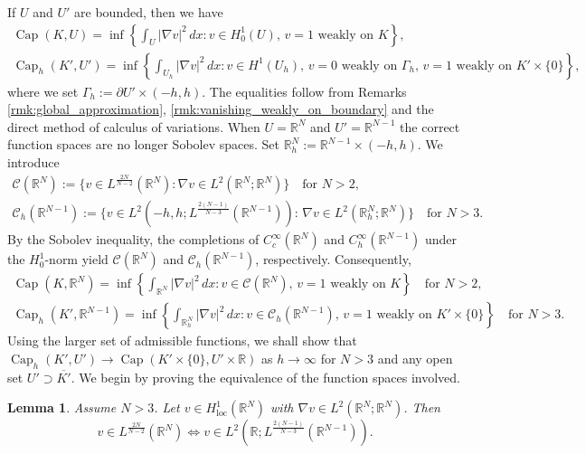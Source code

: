 \documentclass{article}
\numberwithin{equation}{section}
\newtheorem{lemma}[theorem]{Lemma}
\theoremstyle{definition}
\theoremstyle{remark}
\newcommand{\cpct}{\operatorname{Cap}}
\begin{document}
If $U$ and $U'$ are bounded, then we have
\begin{gather*}
    \cpct(K, U) = \inf \left\{\int_U |\nabla v|^2 \, dx : v \in H_0^1(U), \, v = 1 \text{ weakly on } K\right\}, \\
    \cpct_h(K', U') = \inf \left\{\int_{U_h} |\nabla v|^2 \, dx : v \in H^1(U_h), \, v = 0 \text{ weakly on } \Gamma_h, \, v = 1 \text{ weakly on } K' \times \{0\}\right\},
\end{gather*}
where we set $\Gamma_h := \partial U' \times (-h ,h)$. The equalities follow from Remarks \eqref{rmk:global_approximation}, \eqref{rmk:vanishing_weakly_on_boundary} and the direct method of calculus of variations. When $U = \mathbb{R}^N$ and $U' = \mathbb{R}^{N - 1}$ the correct function spaces are no longer Sobolev spaces. Set $\mathbb{R}_h^N := \mathbb{R}^{N - 1} \times (-h, h)$. We introduce
\begin{gather*}
    \mathcal{C}(\mathbb{R}^N) := \{v \in L^\frac{2N}{N - 2}(\mathbb{R}^N) : \nabla v \in L^2(\mathbb{R}^N; \mathbb{R}^N)\} \quad \text{for } N > 2, \\
    \mathcal{C}_h(\mathbb{R}^{N - 1}) := \{v \in L^2(-h , h; L^\frac{2(N - 1)}{N - 3}(\mathbb{R}^{N - 1})) : \, \nabla v \in L^2(\mathbb{R}_h^N; \mathbb{R}^N)\} \quad \text{for } N > 3.
\end{gather*}
By the Sobolev inequality, the completions of $C_c^\infty(\mathbb{R}^N)$ and $C_h^\infty(\mathbb{R}^{N - 1})$ under the $H_0^1$-norm yield $\mathcal{C}(\mathbb{R}^N)$ and $\mathcal{C}_h(\mathbb{R}^{N - 1})$, respectively. Consequently,
\begin{gather} \label{eq:extended_capacity_1}
    \cpct (K, \mathbb{R}^N) = \inf \left\{\int_{\mathbb{R}^N} |\nabla v|^2 \, dx : v \in \mathcal{C}(\mathbb{R}^N), \, v = 1 \text{ weakly on $K$}\right\} \quad \text{for } N > 2, \\ \label{eq:extended_capacity_2}
    \cpct_h(K', \mathbb{R}^{N - 1}) = \inf \left\{\int_{\mathbb{R}_h^N} |\nabla v|^2 \, dx : v \in \mathcal{C}_h(\mathbb{R}^{N - 1}), \, v = 1 \text{ weakly on $K' \times \{0\}$}\right\} \quad \text{for } N > 3.
\end{gather}
Using the larger set of admissible functions, we shall show that $\cpct_h(K', U') \to \cpct(K' \times \{0\}, U' \times \mathbb{R})$ as $h \to \infty$ for $N > 3$ and any open set $U' \supset \overline{K'}$. We begin by proving the equivalence of the function spaces involved.

\begin{lemma} \label{lm:equivalence_of_spaces}
    Assume $N > 3$. Let $v \in H_\mathrm{loc}^1(\mathbb{R}^N)$ with $\nabla v \in L^2(\mathbb{R}^N; \mathbb{R}^N)$. Then
    \begin{equation} \label{eq:equivalence_of_spaces}
        v \in L^\frac{2N}{N - 2}(\mathbb{R}^N) \iff v \in L^2(\mathbb{R}; L^\frac{2(N - 1)}{N - 3}(\mathbb{R}^{N - 1})).
    \end{equation}
\end{lemma}
\end{document}
